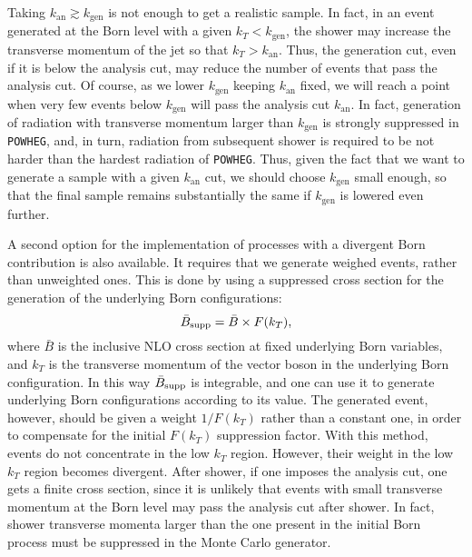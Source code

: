 \documentclass[paper]{JHEP3}
\newcommand{\tmop}[1]{\ensuremath{\operatorname{#1}}}
\newcommand{\tmtextrm}[1]{{\rmfamily{#1}}}
\newcommand\POWHEG{{\tt POWHEG}}
\begin{document}
Taking $k_{\tmop{an}} \gtrsim k_{\tmop{gen}}$ is not enough to get a
realistic sample. In fact, in an event generated at the Born level with a
given $k_T < k_{\tmop{gen}}$, the shower may increase the transverse momentum
of the jet so that $k_T > k_{\tmop{an}}$. Thus, the generation cut, even if
it is below the analysis cut, may reduce the number of events that pass the
analysis cut.  Of course, as we lower $k_{\tmop{gen}}$ keeping
$k_{\tmop{an}}$ fixed, we will reach a point when very few events below
$k_{\tmop{gen}}$ will pass the analysis cut $k_{\tmop{an}}$. In fact,
generation of radiation with transverse momentum larger than $k_{\tmop{gen}}$
is strongly suppressed in \POWHEG{}, and, in turn, radiation from subsequent
shower is required to be not harder than the hardest radiation of
\POWHEG{}. Thus, given the fact that we want to generate a sample with a
given $k_{\tmop{an}}$ cut, we should choose $k_{\tmop{gen}}$ small enough, so
that the final sample remains substantially the same if $k_{\tmop{gen}}$ is
lowered even further.

A second option for the implementation of processes with a divergent Born
contribution is also available. It requires that we generate weighed events,
rather than unweighted ones. This is done by using a suppressed cross section
for the generation of the underlying Born configurations:
\begin{equation}
  \bar{B}_{\text{\tmtextrm{supp}}} = \bar{B} \times F (k_T),
\end{equation}
where $\bar{B}$ is the inclusive NLO cross section at fixed underlying Born
variables, and $k_T$ is the transverse momentum of the vector boson in the
underlying Born configuration. In this way $\bar{B}_{\text{\tmtextrm{supp}}}$
is integrable, and one can use it to generate underlying Born configurations
according to its value. The generated event, however, should be given a
weight $1 / F (k_T)$ rather than a constant one, in order to compensate for
the initial $F (k_T)$ suppression factor. With this method, events do not
concentrate in the low $k_T$ region. However, their weight in the low $k_T$
region becomes divergent. After shower, if one imposes the analysis cut, one
gets a finite cross section, since it is unlikely that events with small
transverse momentum at the Born level may pass the analysis cut after shower.
In fact, shower transverse momenta larger than the one present in the initial
Born process must be suppressed in the Monte Carlo generator.
\end{document}
